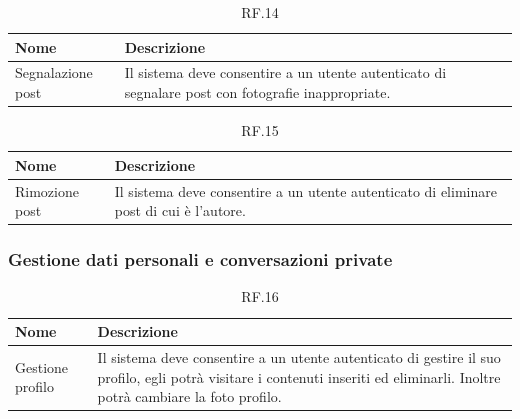 \documentclass{natourDoc}
\begin{document}
\begin{table}[H]
	\centering
	\begin{tabular}{ |p{5cm}|p{10.3cm}| }
		\hline
		\rowcolor{PineGreen!70}
		\textbf{Nome}     & \textbf{Descrizione}                                                                \\
		\hline
		Segnalazione post & Il sistema deve consentire a un utente autenticato di segnalare post con fotografie
		inappropriate.                                                                                          \\
		\hline
	\end{tabular}
	\caption{RF.14}

\end{table}

\begin{table}[H]
	\centering
	\begin{tabular}{ |p{5cm}|p{10.3cm}| }
		\hline
		\rowcolor{PineGreen!70}
		\textbf{Nome}  & \textbf{Descrizione}                                                        \\
		\hline
		Rimozione post & Il sistema deve consentire a un utente autenticato di eliminare post di cui
		è l'autore.                                                                                  \\
		\hline
	\end{tabular}
	\caption{RF.15}

\end{table}

\subsubsection{Gestione dati personali e conversazioni private}
\begin{table}[H]
	\centering
	\begin{tabular}{ |p{5cm}|p{10.3cm}| }
		\hline
		\rowcolor{PineGreen!70}
		\textbf{Nome}    & \textbf{Descrizione}                                                          \\
		\hline
		Gestione profilo & Il sistema deve consentire a un utente autenticato di gestire il suo profilo,
		egli potrà visitare i contenuti inseriti ed eliminarli. Inoltre potrà cambiare la foto profilo.  \\
		\hline
	\end{tabular}
	\caption{RF.16}

\end{table}
\end{document}
